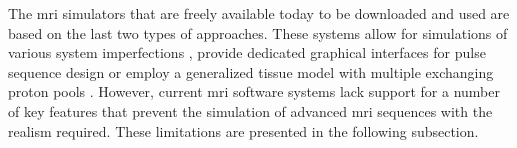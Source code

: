 \hfill

The \ac{mri} simulators that are freely available today to be downloaded and used are based on the last two types of approaches.
These systems allow for simulations of various system imperfections \cite{Drobnjak2006}, 
provide dedicated graphical interfaces for pulse sequence design \cite{Jochimsen2004} \cite{Overall2007} \cite{Stocker2010} 
or
employ a generalized tissue model with multiple exchanging proton pools \cite{Liu2017}.
However, current \ac{mri} software systems lack support for a number of key features that prevent the simulation of advanced \ac{mri} sequences with the realism required.
These limitations are presented in the following subsection.



    
    


